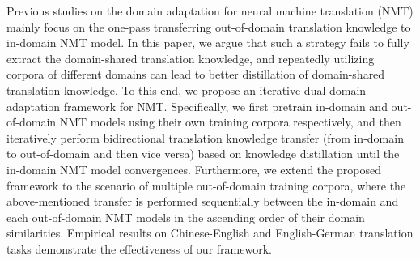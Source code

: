Previous studies on the domain adaptation for neural machine translation (NMT) mainly focus on the one-pass transferring out-of-domain translation knowledge to in-domain NMT model. In this paper, we argue that such a strategy fails to fully extract the domain-shared
translation knowledge, and repeatedly utilizing corpora of different domains can lead
to better distillation of domain-shared translation knowledge. To this end, we propose an iterative dual domain adaptation framework for NMT. Specifically, we first pretrain in-domain and out-of-domain NMT models using their own training corpora respectively,
and then iteratively perform bidirectional translation knowledge transfer (from in-domain to out-of-domain and then vice versa) based on knowledge distillation until the in-domain
NMT model convergences. Furthermore, we extend the proposed framework to the scenario of multiple out-of-domain training corpora, where the above-mentioned transfer is performed sequentially between the in-domain and each out-of-domain NMT models in the ascending order of their domain similarities. Empirical results on Chinese-English and English-German translation tasks demonstrate the effectiveness of our framework.